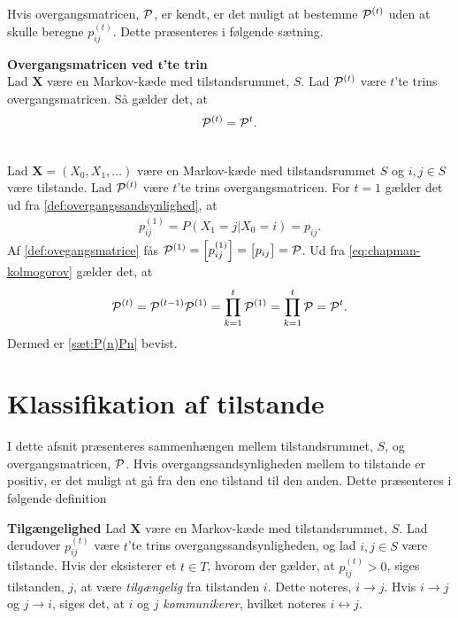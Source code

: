 Hvis overgangsmatricen, $\P$, er kendt, er det muligt at bestemme $\P^{(t)}$ uden at skulle beregne $p_{ij}^{(t)}$.
Dette præsenteres i følgende sætning.

\begin{minipage}\textwidth
\begin{thmx}\textbf{Overgangsmatricen ved $\bm t$'te trin} \label{sæt:P(n)Pn} \\
Lad $\bm X$ være en Markov-kæde med tilstandsrummet, $S$. Lad $\P^{(t)}$ være $t$'te trins overgangsmatricen. Så gælder det, at
    \begin{align*}
        \P^{(t)} = \P^t.
    \end{align*}
\end{thmx}
\end{minipage}

\begin{bev}\textbf{}\\
Lad $\bm X = (X_0, X_1, \ldots)$ være en Markov-kæde med tilstandsrummet $S$ og $i,j\in S$ være tilstande. Lad $\P^{(t)}$ være $t$'te trins overgangsmatricen. For $t=1$ gælder det ud fra \autoref{def:overgangssandsynlighed}, at
\begin{align*}
    p_{ij}^{(1)} = P(X_1=j|X_0=i) = p_{ij}.
\end{align*}
Af \autoref{def:ovegangsmatrice} fås $\P^{(1)} = \left[p_{ij}^{(1)}\right] = \left[p_{ij}\right]= \P$. Ud fra \eqref{eq:chapman-kolmogorov} gælder det, at
\begin{align*}
    \P^{(t)}= \P^{(t-1)}\P^{(1)}=\prod_{k=1}^{t} \P^{(1)} = %
    \prod_{k=1}^{t} \P = \P^{t}.
\end{align*}
Dermed er \autoref{sæt:P(n)Pn} bevist.
\end{bev}


\section{Klassifikation af tilstande}

I dette afsnit præsenteres sammenhængen mellem tilstandsrummet, $S$, og overgangsmatricen, $\P$. Hvis overgangssandsynligheden mellem to tilstande er positiv, er det muligt at gå fra den ene tilstand til den anden. Dette præsenteres i følgende definition

\begin{minipage}\textwidth
\begin{defn}\textbf{Tilgængelighed} \label{def:tilgængelighed} %
\newline
Lad $\bm X$ være en Markov-kæde med tilstandsrummet, $S$. Lad derudover $p_{ij}^{(t)}$ være $t$'te trins overgangssandsynligheden, og lad $i,j \in S$ være tilstande. Hvis der eksisterer et $t\in T$, hvorom der gælder, at $p_{ij}^{(t)}>0$, siges tilstanden, $j$, at være \textit{tilgængelig} fra tilstanden $i$. Dette noteres, $i\to j$. Hvis $i\to j$ og $j\to i$, siges det, at $i$ og $j$ \textit{kommunikerer}, hvilket noteres $i\leftrightarrow j$.
\end{defn}
\end{minipage}

